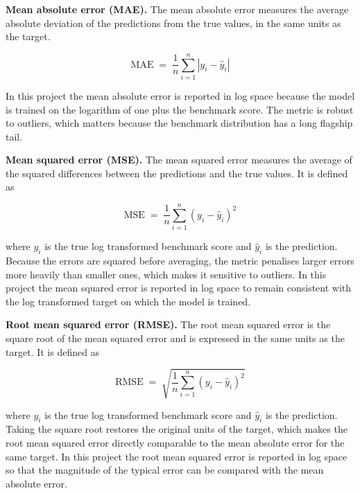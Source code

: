 \documentclass[12pt]{report}
\numberwithin{figure}{chapter}
\numberwithin{table}{chapter}
\numberwithin{equation}{chapter}
\begin{document}
\textbf{Mean absolute error (MAE).} The mean absolute error measures the average absolute deviation of the predictions from the true values, in the same units as the target.

\begin{equation}
\text{MAE} \;=\; \frac{1}{n} \sum_{i=1}^{n} \left| y_i - \hat{y}_i \right|
\label{eq:mae}
\end{equation}

\noindent In this project the mean absolute error is reported in log space because the model is trained on the logarithm of one plus the benchmark score. The metric is robust to outliers, which matters because the benchmark distribution has a long flagship tail.

\textbf{Mean squared error (MSE).} The mean squared error measures the average of the squared differences between the predictions and the true values. It is defined as

\begin{equation}
\text{MSE} \;=\; \frac{1}{n} \sum_{i=1}^{n} \left( y_i - \hat{y}_i \right)^{2}
\label{eq:mse}
\end{equation}

\noindent where $y_i$ is the true log transformed benchmark score and $\hat{y}_i$ is the prediction. Because the errors are squared before averaging, the metric penalises larger errors more heavily than smaller ones, which makes it sensitive to outliers. In this project the mean squared error is reported in log space to remain consistent with the log transformed target on which the model is trained.

\textbf{Root mean squared error (RMSE).} The root mean squared error is the square root of the mean squared error and is expressed in the same units as the target. It is defined as

\begin{equation}
\text{RMSE} \;=\; \sqrt{\frac{1}{n} \sum_{i=1}^{n} \left( y_i - \hat{y}_i \right)^{2}}
\label{eq:rmse}
\end{equation}

\noindent where $y_i$ is the true log transformed benchmark score and $\hat{y}_i$ is the prediction. Taking the square root restores the original units of the target, which makes the root mean squared error directly comparable to the mean absolute error for the same target. In this project the root mean squared error is reported in log space so that the magnitude of the typical error can be compared with the mean absolute error.
\end{document}
